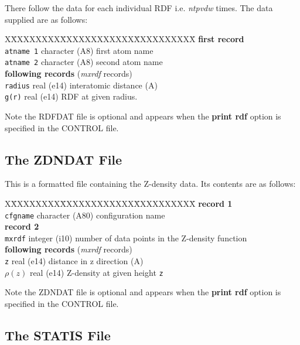 There follow the data for each individual RDF i.e. {\em ntpvdw}
times. The data supplied are as follows:

\begin{tabbing}
X\=XXXXXXXX\=XXXXXXXXXXXX\=XXXXXXXXXX\=\kill
{\bf first record}\\
\> {\tt atname 1} \> character (A8)\> first atom name\\
\> {\tt atname 2} \> character (A8)\> second atom name\\
{\bf following records} ({\em mxrdf} records)\\
\> {\tt radius} \> real (e14) \> interatomic distance (A)\\
\> {\tt g(r)} \> real (e14) \> RDF at given radius.\\
\end{tabbing}
Note the RDFDAT file is optional and appears when the {\bf print rdf}
option is specified in the CONTROL file.

\subsection{The ZDNDAT File}
\label{zdnfile}

This is a formatted file containing the Z-density data. Its contents
are as follows:

\begin{tabbing}
X\=XXXXXXXX\=XXXXXXXXXXXX\=XXXXXXXXXX\=\kill
{\bf record 1}\\
\> {\tt cfgname} \> character (A80)\> configuration name\\
{\bf record 2}\\
\> {\tt mxrdf} \> integer (i10) \> number of data points in the
Z-density function\\
{\bf following records} ({\em mxrdf} records)\\
\> {\tt z} \> real (e14) \> distance in z direction (A)\\
\> $\rho(z)$ \> real (e14) \> Z-density at given height {\tt z}\\
\end{tabbing}

Note the ZDNDAT file is optional and appears when the {\bf print rdf}
option is specified in the CONTROL file.

\subsection{The STATIS File}
\label{statisfile}

